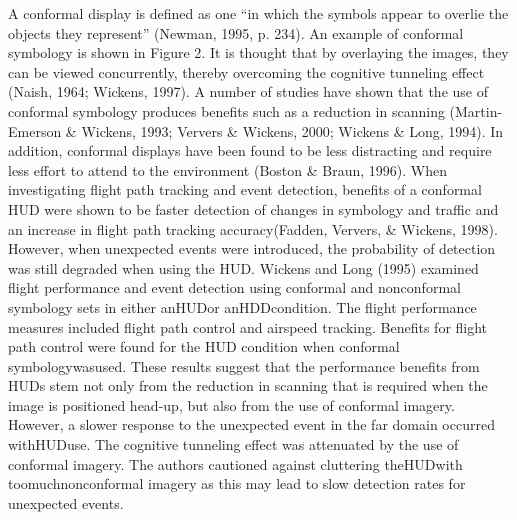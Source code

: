 \documentclass[utf8,bachelor,manualbib]{gradu3}
\begin{document}
A conformal display is defined as one “in which the symbols appear to overlie
the objects they represent” (Newman, 1995, p. 234). An example of conformal
symbology is shown in Figure 2. It is thought that by overlaying the images,
they can be viewed concurrently, thereby overcoming the cognitive tunneling effect
(Naish, 1964; Wickens, 1997).
A number of studies have shown that the use of conformal symbology produces
benefits such as a reduction in scanning (Martin-Emerson \& Wickens, 1993;
Ververs \& Wickens, 2000; Wickens \& Long, 1994). In addition, conformal displays
have been found to be less distracting and require less effort to attend to the
environment (Boston \& Braun, 1996). When investigating flight path tracking and
event detection, benefits of a conformal HUD were shown to be faster detection of
changes in symbology and traffic and an increase in flight path tracking accuracy(Fadden, Ververs, \& Wickens, 1998). However, when unexpected events were introduced,
the probability of detection was still degraded when using the HUD.
Wickens and Long (1995) examined flight performance and event detection using
conformal and nonconformal symbology sets in either anHUDor anHDDcondition.
The flight performance measures included flight path control and airspeed
tracking. Benefits for flight path control were found for the HUD condition when
conformal symbologywasused. These results suggest that the performance benefits
from HUDs stem not only from the reduction in scanning that is required when the
image is positioned head-up, but also from the use of conformal imagery. However,
a slower response to the unexpected event in the far domain occurred withHUDuse.
The cognitive tunneling effect was attenuated by the use of conformal imagery. The
authors cautioned against cluttering theHUDwith toomuchnonconformal imagery
as this may lead to slow detection rates for unexpected events. \citep{crawfordneal2006}
\end{document}
